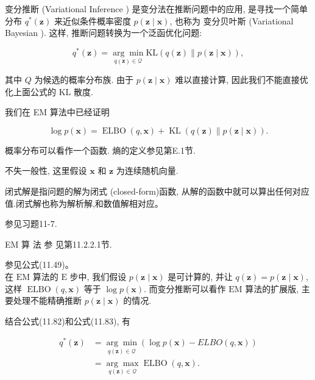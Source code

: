 \documentclass[10pt]{article}
\begin{document}
变分推断 (Variational Inference ) 是变分法在推断问题中的应用, 是寻找一个简单分布 $q^{*}(\boldsymbol{z})$ 来近似条件概率密度 $p(\boldsymbol{z} \mid \boldsymbol{x})$, 也称为 变分贝叶斯 (Variational Bayesian ). 这样, 推断问题转换为一个泛函优化问题:


\begin{equation*}
q^{*}(\boldsymbol{z})=\underset{q(\boldsymbol{z}) \in \mathcal{Q}}{\arg \min } \mathrm{KL}(q(\boldsymbol{z}) \| p(\boldsymbol{z} \mid \boldsymbol{x})), \tag{11.82}
\end{equation*}


其中 $Q$ 为候选的概率分布族. 由于 $p(\boldsymbol{z} \mid \boldsymbol{x})$ 难以直接计算, 因此我们不能直接优化上面公式的 KL 散度.

我们在 EM 算法中已经证明


\begin{equation*}
\log p(\boldsymbol{x})=\operatorname{ELBO}(q, \boldsymbol{x})+\operatorname{KL}(q(\boldsymbol{z}) \| p(\boldsymbol{z} \mid \boldsymbol{x})) . \tag{11.83}
\end{equation*}


概率分布可以看作一个函数. 熵的定义参见第E.1节.

不失一般性, 这里假设 $\boldsymbol{x}$ 和 $\boldsymbol{z}$ 为连续随机向量.

闭式解是指问题的解为闭式 (closed-form)函数, 从解的函数中就可以算出任何对应值.闭式解也称为解析解,和数值解相对应。

参见习题11-7.

EM 算 法 参 见第11.2.2.1节.

参见公式(11.49)。\\
在 $\mathrm{EM}$ 算法的 $\mathrm{E}$ 步中, 我们假设 $p(\boldsymbol{z} \mid \boldsymbol{x})$ 是可计算的, 并让 $q(\boldsymbol{z})=p(\boldsymbol{z} \mid \boldsymbol{x})$, 这样 $\operatorname{ELBO}(q, \boldsymbol{x})$ 等于 $\log p(\boldsymbol{x})$. 而变分推断可以看作 $\mathrm{EM}$ 算法的扩展版, 主要处理不能精确推断 $p(\boldsymbol{z} \mid \boldsymbol{x})$ 的情况.

结合公式(11.82)和公式(11.83), 有


\begin{align*}
q^{*}(\boldsymbol{z}) & =\underset{q(\boldsymbol{z}) \in \mathcal{Q}}{\arg \min }(\log p(\boldsymbol{x})-E L B O(q, \boldsymbol{x}))  \tag{11.84}\\
& =\underset{q(\boldsymbol{z}) \in \mathcal{Q}}{\arg \max } \operatorname{ELBO}(q, \boldsymbol{x}) . \tag{11.85}
\end{align*}
\end{document}
